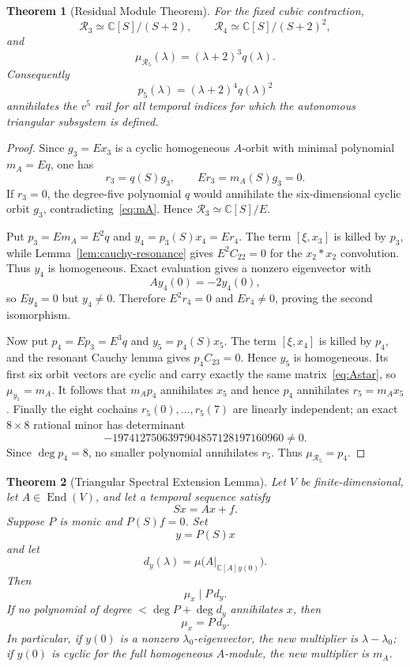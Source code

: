 \documentclass[11pt]{amsart}
\newtheorem{theorem}{Theorem}[section]
\newcommand{\End}{\operatorname{End}}
\newcommand{\C}{\mathbb C}
\begin{document}
\begin{theorem}[Residual Module Theorem]\label{thm:residual-modules}
For the fixed cubic contraction,
\[
\boxed{
\mathcal R_3\simeq \C[S]/(S+2),
\qquad
\mathcal R_4\simeq \C[S]/(S+2)^2,
}
\]
and
\[
\boxed{
\mu_{\mathcal R_5}(\lambda)=(\lambda+2)^3q(\lambda).
}
\]
Consequently
\[
\boxed{
p_5(\lambda)=(\lambda+2)^4q(\lambda)^2
}
\]
annihilates the $v^5$ rail for all temporal indices for which the autonomous triangular subsystem is defined.
\end{theorem}

\begin{proof}
Since $g_3=Ex_3$ is a cyclic homogeneous $A$-orbit with minimal polynomial $m_A=Eq$, one has
\[
r_3=q(S)g_3,
\qquad
Er_3=m_A(S)g_3=0.
\]
If $r_3=0$, the degree-five polynomial $q$ would annihilate the six-dimensional cyclic orbit $g_3$, contradicting~\eqref{eq:mA}.  Hence $\mathcal R_3\simeq\C[S]/E$.

Put $p_3=Em_A=E^2q$ and $y_4=p_3(S)x_4=Er_4$.  The term $[\xi,x_3]$ is killed by $p_3$, while Lemma~\ref{lem:cauchy-resonance} gives $E^2C_{22}=0$ for the $x_2*x_2$ convolution.  Thus $y_4$ is homogeneous.  Exact evaluation gives a nonzero eigenvector with
\[
Ay_4(0)=-2y_4(0),
\]
so $Ey_4=0$ but $y_4\neq0$.  Therefore $E^2r_4=0$ and $Er_4\neq0$, proving the second isomorphism.

Now put $p_4=Ep_3=E^3q$ and $y_5=p_4(S)x_5$.  The term $[\xi,x_4]$ is killed by $p_4$, and the resonant Cauchy lemma gives $p_4C_{23}=0$.  Hence $y_5$ is homogeneous.  Its first six orbit vectors are cyclic and carry exactly the same matrix~\eqref{eq:Astar}, so $\mu_{y_5}=m_A$.  It follows that $m_Ap_4$ annihilates $x_5$ and hence $p_4$ annihilates $r_5=m_Ax_5$.  Finally the eight cochains $r_5(0),\ldots,r_5(7)$ are linearly independent; an exact $8\times8$ rational minor has determinant
\[
-1974127506397904857128197160960\neq0.
\]
Since $\deg p_4=8$, no smaller polynomial annihilates $r_5$.  Thus $\mu_{\mathcal R_5}=p_4$.
\end{proof}

\begin{theorem}[Triangular Spectral Extension Lemma]\label{thm:triangular-spectral-extension}
Let $V$ be finite-dimensional, let $A\in\End(V)$, and let a temporal sequence satisfy
\[
Sx=Ax+f.
\]
Suppose $P$ is monic and $P(S)f=0$.  Set
\[
y=P(S)x
\]
and let
\[
d_y(\lambda)=\mu\bigl(A|_{\C[A]y(0)}\bigr).
\]
Then
\[
\mu_x\mid P\,d_y.
\]
If no polynomial of degree $<\deg P+\deg d_y$ annihilates $x$, then
\[
\boxed{\mu_x=P\,d_y.}
\]
In particular, if $y(0)$ is a nonzero $\lambda_0$-eigenvector, the new multiplier is $\lambda-\lambda_0$; if $y(0)$ is cyclic for the full homogeneous $A$-module, the new multiplier is $m_A$.
\end{theorem}
\end{document}
